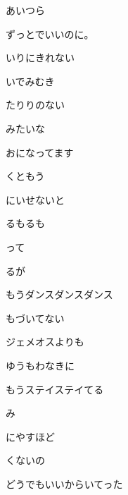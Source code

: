 \documentclass[a4paper,tate,twocolumn,12pt]{ltjtarticle}
\begin{document}
\thispagestyle{empty}

\begin{center}
{\LARGE あいつら}

{\large ずっとでいいのに。}
\end{center}

\vspace{1em}

\begin{flushleft}

\noindent\begin{minipage}{\linewidth}
いりにきれない

いでみむき

たりりのない

みたいな

おになってます

くともう

にいせないと

るもるも

って

るが
\end{minipage}

\vspace{2em}

\noindent\begin{minipage}{\linewidth}
もうダンスダンスダンス

もづいてない

ジェメオスよりも

ゆうもわなきに

もうステイステイてる

み

にやすほど

くないの
\end{minipage}

\vspace{2em}

\noindent\begin{minipage}{\linewidth}
どうでもいいからいてった


\end{minipage}
\end{flushleft}
\end{document}
